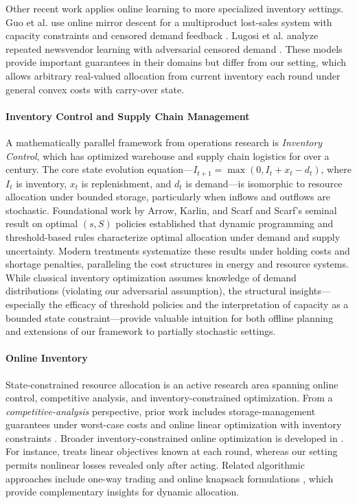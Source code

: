 \documentclass[11pt]{article}
\begin{document}
Other recent work applies online learning to more specialized inventory settings. Guo et al. use online mirror descent for a multiproduct lost-sales system with capacity constraints and censored demand feedback \cite{guo2024omd}. Lugosi et al. analyze repeated newsvendor learning with adversarial censored demand \cite{lugosi2024hardness}. These models provide important guarantees in their domains but differ from our setting, which allows arbitrary real-valued allocation from current inventory each round under general convex costs with carry-over state.



\paragraph{Inventory Control and Supply Chain Management}
A mathematically parallel framework from operations research is \emph{Inventory Control}, which has optimized warehouse and supply chain logistics for over a century. The core state evolution equation---$I_{t+1} = \max(0, I_t + x_t - d_t)$, where $I_t$ is inventory, $x_t$ is replenishment, and $d_t$ is demand---is isomorphic to resource allocation under bounded storage, particularly when inflows and outflows are stochastic. Foundational work by Arrow, Karlin, and Scarf \cite{arrow1958studies} and Scarf's seminal result on optimal $(s,S)$ policies \cite{scarf1960optimality} established that dynamic programming and threshold-based rules characterize optimal allocation under demand and supply uncertainty. Modern treatments \cite{zipkin2000foundations,porteus2002foundations} systematize these results under holding costs and shortage penalties, paralleling the cost structures in energy and resource systems. While classical inventory optimization assumes knowledge of demand distributions (violating our adversarial assumption), the structural insights---especially the efficacy of threshold policies and the interpretation of capacity as a bounded state constraint---provide valuable intuition for both offline planning and extensions of our framework to partially stochastic settings.


\paragraph{Online Inventory }

State-constrained resource allocation is an active research area spanning online control, competitive analysis, and inventory-constrained optimization. From a \emph{competitive-analysis} perspective, prior work includes storage-management guarantees under worst-case costs \cite{Chau2016} and online linear optimization with inventory constraints \cite{Yang2020}. Broader inventory-constrained online optimization is developed in \cite{yang2020online,lin2019competitive,chau2016cost,neely-inventory-control-cdc2010}. For instance, \cite{yang2020online} treats linear objectives known at each round, whereas our setting permits nonlinear losses revealed only after acting. Related algorithmic approaches include one-way trading and online knapsack formulations \cite{cao2020optimal,el2001optimal}, which provide complementary insights for dynamic allocation.
\end{document}
